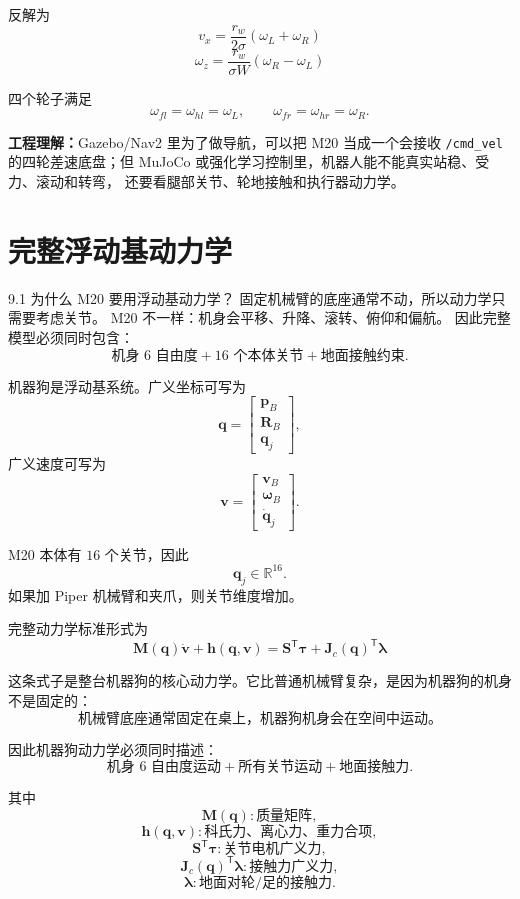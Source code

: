 \documentclass[UTF8,11pt,a4paper]{ctexart}
\newcommand{\R}{\mathbb{R}}
\newcommand{\T}{^{\mathsf T}}
\newcommand{\bs}[1]{\bm{#1}}
\begin{document}
反解为
\[
\boxed{
v_x
=
\frac{r_w}{2\sigma}(\omega_L+\omega_R)
}
\]
\[
\boxed{
\omega_z
=
\frac{r_w}{\sigma W}(\omega_R-\omega_L)
}
\]

四个轮子满足
\[
\omega_{fl}=\omega_{hl}=\omega_L,
\qquad
\omega_{fr}=\omega_{hr}=\omega_R.
\]

\begin{answerbox}
\textbf{工程理解：}Gazebo/Nav2 里为了做导航，可以把 M20 当成一个会接收
\texttt{/cmd\_vel} 的四轮差速底盘；但 MuJoCo 或强化学习控制里，机器人能不能真实站稳、受力、滚动和转弯，
还要看腿部关节、轮地接触和执行器动力学。
\end{answerbox}

\section{完整浮动基动力学}

\begin{conceptbox}{9.1 为什么 M20 要用浮动基动力学？}
固定机械臂的底座通常不动，所以动力学只需要考虑关节。
M20 不一样：机身会平移、升降、滚转、俯仰和偏航。
因此完整模型必须同时包含：
\[
\text{机身 6 自由度}
+
\text{16 个本体关节}
+
\text{地面接触约束}.
\]
\end{conceptbox}

机器狗是浮动基系统。广义坐标可写为
\[
\bs q =
\begin{bmatrix}
\bs p_B\\
\bs R_B\\
\bs q_j
\end{bmatrix},
\]
广义速度可写为
\[
\bs v =
\begin{bmatrix}
\bs v_B\\
\bs \omega_B\\
\dot{\bs q}_j
\end{bmatrix}.
\]

M20 本体有 \(16\) 个关节，因此
\[
\bs q_j\in\R^{16}.
\]
如果加 Piper 机械臂和夹爪，则关节维度增加。

完整动力学标准形式为
\[
\boxed{
\bs M(\bs q)\dot{\bs v}
+\bs h(\bs q,\bs v)
=
\bs S\T\bs \tau
+\bs J_c(\bs q)\T\bs \lambda
}
\]

这条式子是整台机器狗的核心动力学。它比普通机械臂复杂，是因为机器狗的机身不是固定的：
\[
\text{机械臂底座通常固定在桌上，机器狗机身会在空间中运动。}
\]

因此机器狗动力学必须同时描述：
\[
\text{机身 6 自由度运动}
+\text{所有关节运动}
+\text{地面接触力}.
\]

其中
\[
\bs M(\bs q):\text{质量矩阵},
\]
\[
\bs h(\bs q,\bs v):\text{科氏力、离心力、重力合项},
\]
\[
\bs S\T\bs \tau:\text{关节电机广义力},
\]
\[
\bs J_c(\bs q)\T\bs \lambda:\text{接触力广义力},
\]
\[
\bs \lambda:\text{地面对轮/足的接触力}.
\]
\end{document}
